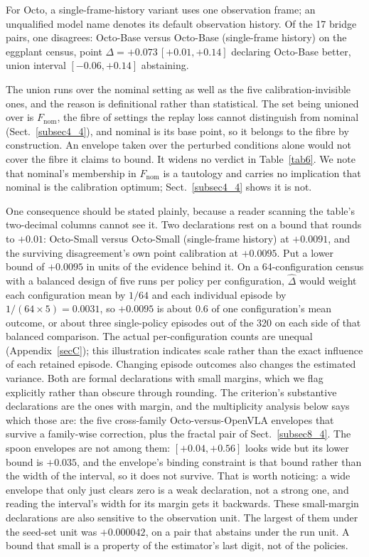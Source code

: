 \documentclass[pdflatex,iicol,sn-apa]{sn-jnl}
\theoremstyle{remark}
\begin{document}
For Octo, a single-frame-history variant uses one observation frame; an unqualified model name denotes its default observation history.
Of the 17 bridge pairs, one disagrees: Octo-Base versus Octo-Base (single-frame history) on the
eggplant census, point $\Delta = +0.073\,[+0.01, +0.14]$ declaring Octo-Base better, union
interval $[-0.06, +0.14]$ abstaining.

The union runs over the nominal setting as well as the five calibration-invisible ones, and the
reason is definitional rather than statistical. The set being unioned over is $F_{\mathrm{nom}}$,
the fibre of settings the replay loss cannot distinguish from nominal (Sect.~\ref{subsec4_4}), and
nominal is its base point, so it belongs to the fibre by construction. An envelope taken over the
perturbed conditions alone would not cover the fibre it claims to bound. It widens no verdict in
Table~\ref{tab6}. We note that nominal's membership in $F_{\mathrm{nom}}$ is a tautology and carries
no implication that nominal is the calibration optimum; Sect.~\ref{subsec4_4} shows it is not.

One consequence should be stated plainly, because a reader scanning the table's two-decimal columns
cannot see it. Two declarations rest on a bound that rounds to $+0.01$: Octo-Small versus
Octo-Small (single-frame history) at $+0.0091$, and the surviving disagreement's own point calibration at
$+0.0095$. Put a lower bound of $+0.0095$ in units of the evidence behind it. On a 64-configuration
census with a balanced design of five runs per policy per configuration, $\hat\Delta$ would weight each configuration mean by $1/64$ and each
individual episode by $1/(64 \times 5) = 0.0031$, so $+0.0095$ is about $0.6$ of one
configuration's mean outcome, or about three single-policy episodes out of the 320 on each
side of that balanced comparison. The actual per-configuration counts are unequal
(Appendix~\ref{secC}); this illustration indicates scale rather than the exact influence of each
retained episode. Changing episode outcomes also changes the estimated variance.
Both are formal declarations with small margins, which we flag explicitly rather than obscure
through rounding. The criterion's substantive declarations are the ones with margin,
and the multiplicity analysis below says which those are: the five cross-family Octo-versus-OpenVLA
envelopes that survive a family-wise correction, plus the fractal pair of Sect.~\ref{subsec8_4}. The
spoon envelopes are not among them: $[+0.04, +0.56]$ looks wide but its lower bound is
$+0.035$, and the envelope's binding constraint is that bound rather than the width of the interval,
so it does not survive. That is worth noticing: a wide envelope that only just clears zero is a weak
declaration, not a strong one, and reading the interval's width for its margin gets it backwards. These small-margin declarations are also sensitive to the observation unit.
The largest of them under the seed-set unit was $+0.000042$, on a pair that abstains under the run
unit. A bound that small is a property of the estimator's last digit, not of the policies.
\end{document}
